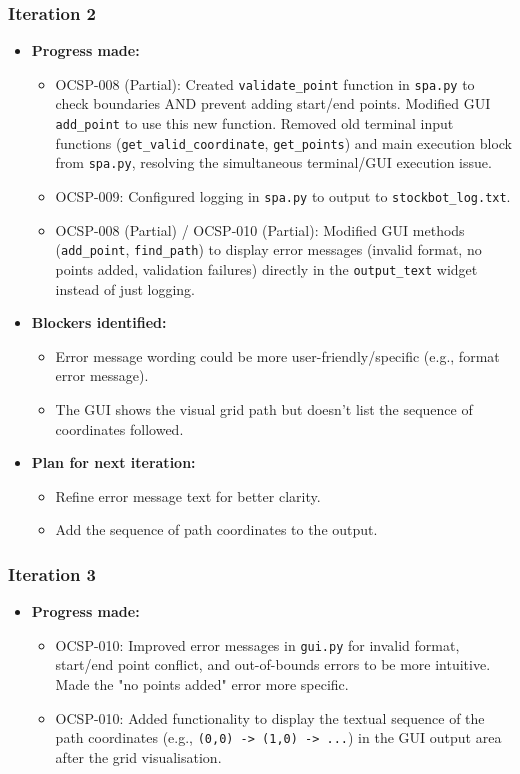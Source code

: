 \subsubsection{Iteration 2}
\begin{itemize}
	\item \textbf{Progress made:}
	\begin{itemize}
		\item OCSP-008 (Partial): Created \verb|validate_point| function in \verb|spa.py| to check boundaries AND prevent adding start/end points. Modified GUI \verb|add_point| to use this new function. Removed old terminal input functions (\verb|get_valid_coordinate|, \verb|get_points|) and main execution block from \verb|spa.py|, resolving the simultaneous terminal/GUI execution issue.
		\item OCSP-009: Configured logging in \verb|spa.py| to output to \verb|stockbot_log.txt|.
		\item OCSP-008 (Partial) / OCSP-010 (Partial): Modified GUI methods (\verb|add_point|, \verb|find_path|) to display error messages (invalid format, no points added, validation failures) directly in the \verb|output_text| widget instead of just logging.
	\end{itemize}
	\clearpage
	\item \textbf{Blockers identified:}
	\begin{itemize}
		\item Error message wording could be more user-friendly/specific (e.g., format error message).
		\item The GUI shows the visual grid path but doesn't list the sequence of coordinates followed.
	\end{itemize}
	\item \textbf{Plan for next iteration:}
	\begin{itemize}
		\item Refine error message text for better clarity.
		\item Add the sequence of path coordinates to the output.
	\end{itemize}
\end{itemize}

\subsubsection{Iteration 3}
\begin{itemize}
	\item \textbf{Progress made:}
	\begin{itemize}
		\item OCSP-010: Improved error messages in \verb|gui.py| for invalid format, start/end point conflict, and out-of-bounds errors to be more intuitive. Made the "no points added" error more specific.
		\item OCSP-010: Added functionality to display the textual sequence of the path coordinates (e.g., \verb|(0,0) -> (1,0) -> ...|) in the GUI output area after the grid visualisation.
	\end{itemize}
\end{itemize}

